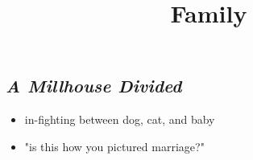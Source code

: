 \documentclass[11pt]{article}
\begin{document}
\title{Family}
\maketitle

\subsection{\textit{A Millhouse Divided}}
\begin{itemize}
  \item in-fighting between dog, cat, and baby
  \item "is this how you pictured marriage?"
\end{itemize}
\end{document}
